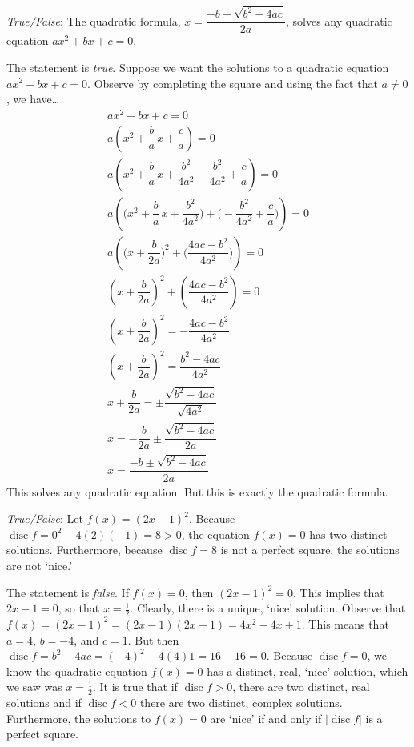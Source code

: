 \documentclass[11pt,letterpaper]{article}
\DeclareMathOperator{\disc}{disc}	%
\begin{document}
\quizsol \textit{True/False}: The quadratic formula, $x= \dfrac{-b \pm \sqrt{b^2 - 4ac}}{2a}$, solves any quadratic equation $ax^2 + bx + c= 0$. \pspace

\sol The statement is \textit{true}. Suppose we want the solutions to a quadratic equation $ax^2 + bx + c= 0$. Observe by completing the square and using the fact that $a \neq 0$, we have\dots
	\[
	\begin{gathered}
	ax^2 + bx + c= 0 \\
	a \left(x^2 + \dfrac{b}{a}\, x + \dfrac{c}{a} \right)= 0 \\
	a \left(x^2 + \dfrac{b}{a}\, x + \dfrac{b^2}{4a^2} - \dfrac{b^2}{4a^2} + \dfrac{c}{a} \right)= 0 \\
	a \left( \bigg( x^2 + \dfrac{b}{a}\, x + \dfrac{b^2}{4a^2} \bigg) + \bigg( -\dfrac{b^2}{4a^2} + \dfrac{c}{a} \bigg) \right)= 0 \\
	a \left( \bigg(x + \dfrac{b}{2a} \bigg)^2 + \bigg( \dfrac{4ac - b^2}{4a^2} \bigg) \right)= 0 \\
	\left( x + \dfrac{b}{2a} \right)^2 + \left( \dfrac{4ac - b^2}{4a^2} \right)= 0 \\
	\left( x + \dfrac{b}{2a} \right)^2 = - \dfrac{4ac - b^2}{4a^2} \\
	\left( x + \dfrac{b}{2a} \right)^2 = \dfrac{b^2 - 4ac}{4a^2} \\
	x + \dfrac{b}{2a}= \pm \dfrac{\sqrt{b^2 - 4ac}}{\sqrt{4a^2}} \\
	x= -\dfrac{b}{2a} \pm \dfrac{\sqrt{b^2 - 4ac}}{2a} \\
	x= \dfrac{-b \pm \sqrt{b^2 - 4ac}}{2a}
	\end{gathered}
	\]
This solves any quadratic equation. But this is exactly the quadratic formula. \pvspace{1.3cm}
	


\quizsol \textit{True/False}: Let $f(x)= (2x - 1)^2$. Because $\disc f= 0^2 - 4(2)(-1)= 8 > 0$, the equation $f(x)= 0$ has two distinct solutions. Furthermore, because $\disc f= 8$ is not a perfect square, the solutions are not `nice.' \pspace

\sol The statement is \textit{false}. If $f(x)= 0$, then $(2x - 1)^2= 0$. This implies that $2x - 1= 0$, so that $x= \frac{1}{2}$. Clearly, there is a unique, `nice' solution. Observe that $f(x)= (2x - 1)^2= (2x - 1)(2x - 1)= 4x^2 - 4x + 1$. This means that $a= 4$, $b= -4$, and $c= 1$. But then $\disc f= b^2 - 4ac= (-4)^2 - 4(4)1= 16 - 16= 0$. Because $\disc f= 0$, we know the quadratic equation $f(x)= 0$ has a distinct, real, `nice' solution, which we saw was $x= \frac{1}{2}$. It is true that if $\disc f > 0$, there are two distinct, real solutions and if $\disc f < 0$ there are two distinct, complex solutions. Furthermore, the solutions to $f(x)= 0$ are `nice' if and only if $|\disc f|$ is a perfect square. 
\end{document}

